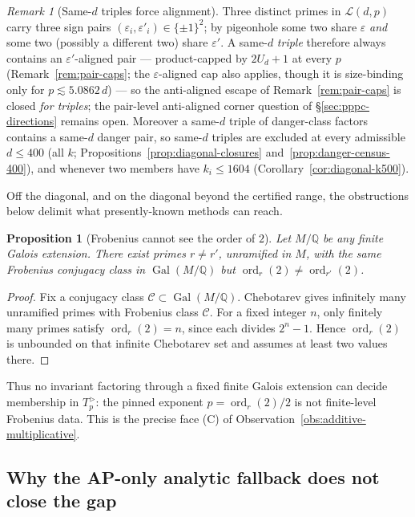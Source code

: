 \documentclass[11pt]{amsart}
\theoremstyle{plain}
\newtheorem{proposition}[theorem]{Proposition}
\theoremstyle{definition}
\theoremstyle{remark}
\newtheorem{remark}[theorem]{Remark}
\numberwithin{equation}{section}
\newcommand{\ord}{\operatorname{ord}}
\newcommand{\Gal}{\operatorname{Gal}}
\newcommand{\Q}{\mathbb{Q}}
\begin{document}
\begin{remark}[Same-$d$ triples force alignment]\label{rem:same-d-triples}
Three distinct primes in $\mathcal{L}(d, p)$ carry three sign pairs $(\varepsilon_i, \varepsilon'_i) \in \{\pm 1\}^2$; by pigeonhole some two share $\varepsilon$ \emph{and} some two (possibly a different two) share $\varepsilon'$. A same-$d$ \emph{triple} therefore always contains an $\varepsilon'$-aligned pair --- product-capped by $2 U_d + 1$ at every $p$ (Remark~\ref{rem:pair-caps}; the $\varepsilon$-aligned cap also applies, though it is size-binding only for $p \lesssim 5.0862\, d$) --- so the anti-aligned escape of Remark~\ref{rem:pair-caps} is closed \emph{for triples}; the pair-level anti-aligned corner question of \S\ref{sec:pppc-directions} remains open. Moreover a same-$d$ triple of danger-class factors contains a same-$d$ danger pair, so same-$d$ triples are excluded at every admissible $d \leq 400$ (all $k$; Propositions~\ref{prop:diagonal-closures} and~\ref{prop:danger-census-400}), and whenever two members have $k_i \leq 1604$ (Corollary~\ref{cor:diagonal-k500}).
\end{remark}

Off the diagonal, and on the diagonal beyond the certified range, the obstructions below delimit what presently-known methods can reach.

\begin{proposition}[Frobenius cannot see the order of $2$]\label{prop:frobenius-blind}
Let $M/\Q$ be any finite Galois extension. There exist primes $r\neq r'$, unramified in $M$, with the same Frobenius conjugacy class in $\Gal(M/\Q)$ but $\ord_r(2)\neq\ord_{r'}(2)$.
\end{proposition}

\begin{proof}
Fix a conjugacy class $\mathcal C\subset\Gal(M/\Q)$. Chebotarev gives infinitely many unramified primes with Frobenius class $\mathcal C$. For a fixed integer $n$, only finitely many primes satisfy $\ord_r(2)=n$, since each divides $2^n-1$. Hence $\ord_r(2)$ is unbounded on that infinite Chebotarev set and assumes at least two values there.
\end{proof}

Thus no invariant factoring through a fixed finite Galois extension can decide membership in $T_p^{>}$: the pinned exponent $p=\ord_r(2)/2$ is not finite-level Frobenius data. This is the precise face (C) of Observation~\ref{obs:additive-multiplicative}.

\subsection{Why the AP-only analytic fallback does not close the gap}\label{sec:weaker-blocked}
\end{document}
